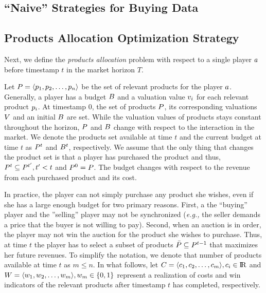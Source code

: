 
\subsection{``Naive'' Strategies for Buying Data}

\subsection{Products Allocation Optimization Strategy}

Next, we define the \emph{products allocation} problem with respect to a single player $a$ before timestamp $t$ in the market horizon $T$.

Let $P = \langle p_1, p_2, \dots, p_n\rangle$ be the set of relevant products for the player $a$. Generally, a player has a budget $B$ and a valuation value $v_i$ for each relevant product $p_i$. At timestamp $0$, the set of products $P$, its corresponding valuations $V$ and an initial $B$ are set. While the valuation values of products stays constant throughout the horizon, $P$ and $B$ change with respect to the interaction in the market. We denote the products set available at time $t$ and the current budget at time $t$ as $P^{t}$ and $B^{t}$, respectively. We assume that the only thing that changes the product set is that a player has purchased the product and thus, $P^{t} \subseteq P^{t^{\prime}}, t^{\prime}<t$ and $P^{0} = P$. The budget changes with respect to the revenue from each purchased product and its cost.  

In practice, the player can not simply purchase any product she wishes, even if she has a large enough budget for two primary reasons. First, a the ``buying'' player and the ''selling'' player may not be synchronized (\emph{e.g.,} the seller demands a price that the buyer is not willing to pay). Second, when an auction is in order, the player may not win the auction for the product she wishes to purchase. Thus, at time $t$ the player has to select a subset of products $\bar{P} \subseteq P^{t-1}$ that maximizes her future revenues. To simplify the notation, we denote that number of products available at time $t$ as $m\leq n$. In what follows, let $C = \langle c_1, c_2, \dots, c_{m}\rangle, c_i\in {\rm I\!R}$ and $W = \langle w_1, w_2, \dots, w_m\rangle, w_{m}\in \{0,1\}$ represent a realization of costs and win indicators of the relevant products after timestamp $t$ has completed, respectively.

